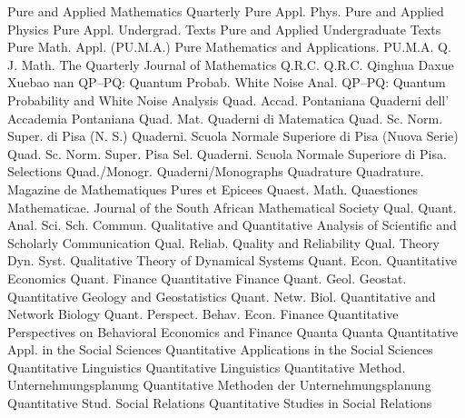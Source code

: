 {Pure and Applied Mathematics Quarterly}
{Pure Appl. Phys.}
{Pure and Applied Physics}
{Pure Appl. Undergrad. Texts}
{Pure and Applied Undergraduate Texts}
{Pure Math. Appl. (PU.M.A.)}
{Pure Mathematics and Applications. PU.M.A.}
{Q. J. Math.}
{The Quarterly Journal of Mathematics}
{Q.R.C.}
{Q.R.C.}
{Qinghua Daxue Xuebao}
{nan}
{QP--PQ: Quantum Probab. White Noise Anal.}
{QP--PQ: Quantum Probability and White Noise Analysis}
{Quad. Accad. Pontaniana}
{Quaderni dell' Accademia Pontaniana}
{Quad. Mat.}
{Quaderni di Matematica}
{Quad. Sc. Norm. Super. di Pisa (N. S.)}
{Quaderni. Scuola Normale Superiore di Pisa (Nuova Serie)}
{Quad. Sc. Norm. Super. Pisa Sel.}
{Quaderni. Scuola Normale Superiore di Pisa. Selections}
{Quad./Monogr.}
{Quaderni/Monographs}
{Quadrature}
{Quadrature. Magazine de Mathematiques Pures et Epicees}
{Quaest. Math.}
{Quaestiones Mathematicae. Journal of the South African Mathematical Society}
{Qual. Quant. Anal. Sci. Sch. Commun.}
{Qualitative and Quantitative Analysis of Scientific and Scholarly Communication}
{Qual. Reliab.}
{Quality and Reliability}
{Qual. Theory Dyn. Syst.}
{Qualitative Theory of Dynamical Systems}
{Quant. Econ.}
{Quantitative Economics}
{Quant. Finance}
{Quantitative Finance}
{Quant. Geol. Geostat.}
{Quantitative Geology and Geostatistics}
{Quant. Netw. Biol.}
{Quantitative and Network Biology}
{Quant. Perspect. Behav. Econ. Finance}
{Quantitative Perspectives on Behavioral Economics and Finance}
{Quanta}
{Quanta}
{Quantitative Appl. in the Social Sciences}
{Quantitative Applications in the Social Sciences}
{Quantitative Linguistics}
{Quantitative Linguistics}
{Quantitative Method. Unternehmungsplanung}
{Quantitative Methoden der Unternehmungsplanung}
{Quantitative Stud. Social Relations}
{Quantitative Studies in Social Relations}

